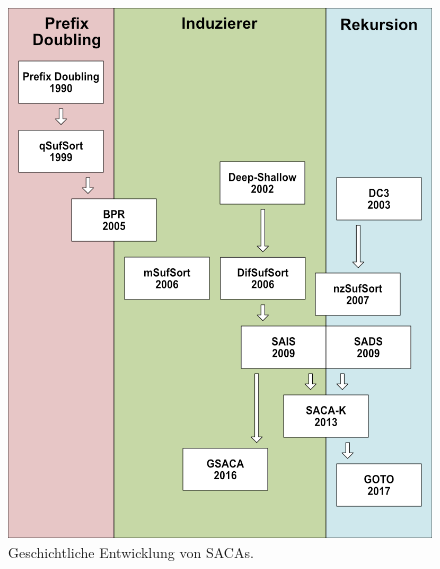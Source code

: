 \begin{figure}[H]
	\centering
	\includegraphics[width=\linewidth]{kapitel/saca_uebersicht/history/history2}
	\caption[Geschichtliche Entwicklung von SACAs.]{Geschichtliche Entwicklung von SACAs.}
	\label{fig_banane_1_2}
\end{figure}
